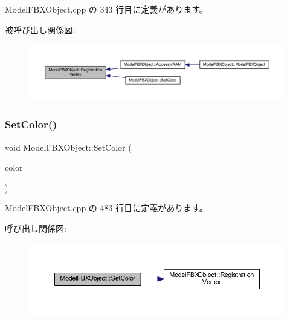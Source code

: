 Model\+F\+B\+X\+Object.\+cpp の 343 行目に定義があります。

被呼び出し関係図\+:
\nopagebreak
\begin{figure}[H]
\begin{center}
\leavevmode
\includegraphics[width=350pt]{class_model_f_b_x_object_aa74ce889c6840f2a9d0fa54b420b9e2d_icgraph}
\end{center}
\end{figure}
\mbox{\label{class_model_f_b_x_object_acbe9d90631a3ac39b9cf65097c39aaa9}} 
\subsubsection{\texorpdfstring{Set\+Color()}{SetColor()}}
{\footnotesize\ttfamily void Model\+F\+B\+X\+Object\+::\+Set\+Color (\begin{DoxyParamCaption}\item[{\mbox{\hyperlink{_vector3_d_8h_a680c30c4a07d86fe763c7e01169cd6cc}{X\+Color4}}}]{color }\end{DoxyParamCaption})}



 Model\+F\+B\+X\+Object.\+cpp の 483 行目に定義があります。

呼び出し関係図\+:
\nopagebreak
\begin{figure}[H]
\begin{center}
\leavevmode
\includegraphics[width=350pt]{class_model_f_b_x_object_acbe9d90631a3ac39b9cf65097c39aaa9_cgraph}
\end{center}
\end{figure}
\mbox{\label{class_model_f_b_x_object_a3c101cf65da1bdb55b7a11e71cefcad0}} 
